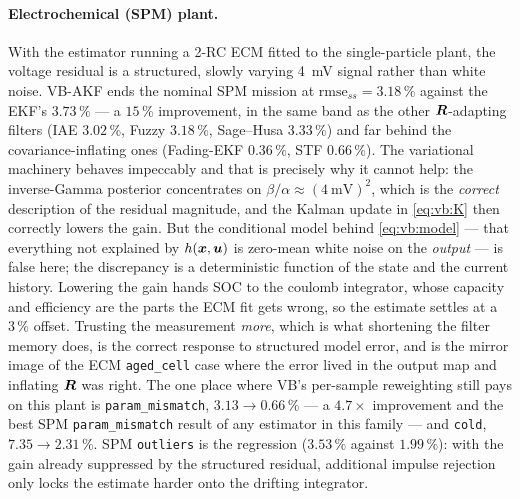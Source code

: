 \paragraph{Electrochemical (SPM) plant.}  With the estimator running a 2-RC ECM fitted to the
single-particle plant, the voltage residual is a structured, slowly varying \SI{4}{\milli\volt}
signal rather than white noise.  VB-AKF ends the nominal SPM mission at
$\mathrm{rmse}_{ss}=3.18\,\%$ against the EKF's $3.73\,\%$ --- a $15\,\%$ improvement, in the same
band as the other $\bm{R}$-adapting filters (IAE $3.02\,\%$, Fuzzy $3.18\,\%$, Sage--Husa $3.33\,\%$)
and far behind the covariance-inflating ones (Fading-EKF $0.36\,\%$, STF $0.66\,\%$).  The
variational machinery behaves impeccably and that is precisely why it cannot help: the inverse-Gamma
posterior concentrates on $\beta/\alpha\approx(\SI{4}{\milli\volt})^2$, which is the \emph{correct}
description of the residual magnitude, and the Kalman update in \eqref{eq:vb:K} then correctly lowers
the gain.  But the conditional model behind \eqref{eq:vb:model} --- that everything not explained by
$h(\bm{x},\bm{u})$ is zero-mean white noise on the \emph{output} --- is false here; the discrepancy is a
deterministic function of the state and the current history.  Lowering the gain hands SOC to the
coulomb integrator, whose capacity and efficiency are the parts the ECM fit gets wrong, so the
estimate settles at a $3\,\%$ offset.  Trusting the measurement \emph{more}, which is what shortening
the filter memory does, is the correct response to structured model error, and is the mirror image of
the ECM \texttt{aged\_cell} case where the error lived in the output map and inflating $\bm{R}$ was
right.  The one place where VB's per-sample reweighting still pays on this plant is
\texttt{param\_mismatch}, $3.13\to0.66\,\%$ --- a $4.7\times$ improvement and the best SPM
\texttt{param\_mismatch} result of any estimator in this family --- and \texttt{cold},
$7.35\to2.31\,\%$.  SPM \texttt{outliers} is the regression ($3.53\,\%$ against $1.99\,\%$): with the
gain already suppressed by the structured residual, additional impulse rejection only locks the
estimate harder onto the drifting integrator.

